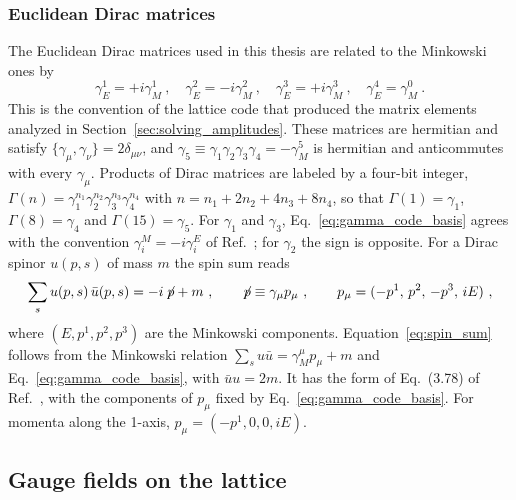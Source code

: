 \subsubsection{Euclidean Dirac matrices}
The Euclidean Dirac matrices used in this thesis are related to the Minkowski ones by
\begin{equation}
    \gamma^{1}_{E}=+i\gamma^{1}_{M} \ , \quad \gamma^{2}_{E}=-i\gamma^{2}_{M} \ , \quad \gamma^{3}_{E}=+i\gamma^{3}_{M} \ , \quad \gamma^{4}_{E}=\gamma^{0}_{M} \ .
    \label{eq:gamma_code_basis}
\end{equation}
This is the convention of the lattice code that produced the matrix elements analyzed in Section~\ref{sec:solving_amplitudes}. These matrices are hermitian and satisfy $\{\gamma_\mu,\gamma_\nu\}=2\delta_{\mu\nu}$, and $\gamma_5\equiv\gamma_1\gamma_2\gamma_3\gamma_4=-\gamma^5_M$ is hermitian and anticommutes with every $\gamma_\mu$. Products of Dirac matrices are labeled by a four-bit integer, $\Gamma(n)=\gamma_1^{n_1}\gamma_2^{n_2}\gamma_3^{n_3}\gamma_4^{n_4}$ with $n=n_1+2n_2+4n_3+8n_4$, so that $\Gamma(1)=\gamma_1$, $\Gamma(8)=\gamma_4$ and $\Gamma(15)=\gamma_5$. For $\gamma_1$ and $\gamma_3$, Eq.~\eqref{eq:gamma_code_basis} agrees with the convention $\gamma_i^M=-i\gamma_i^E$ of Ref.~\cite{Lin:2014}; for $\gamma_2$ the sign is opposite. For a Dirac spinor $u(p,s)$ of mass $m$ the spin sum reads
\begin{equation}
    \sum_s u(p,s)\,\bar u(p,s) = -i\,{\not\!p}+m \ , \qquad {\not\!p}\equiv\gamma_\mu p_\mu \ , \qquad p_\mu=(-p^1,\,p^2,\,-p^3,\,iE) \ ,
    \label{eq:spin_sum}
\end{equation}
where $(E,p^1,p^2,p^3)$ are the Minkowski components. Equation~\eqref{eq:spin_sum} follows from the Minkowski relation $\sum_s u\bar u=\gamma^\mu_M p_\mu+m$ and Eq.~\eqref{eq:gamma_code_basis}, with $\bar u u=2m$. It has the form of Eq.~(3.78) of Ref.~\cite{Lin:2014}, with the components of $p_\mu$ fixed by Eq.~\eqref{eq:gamma_code_basis}. For momenta along the 1-axis, $p_\mu=(-p^1,0,0,iE)$.

\subsection{Gauge fields on the lattice}
\label{sec:lat_gauge}


